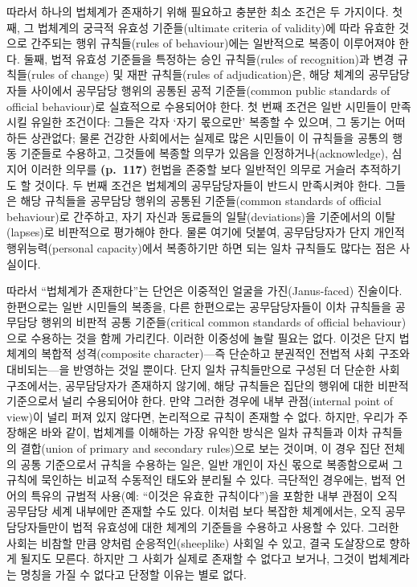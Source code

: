 따라서 하나의 법체계가 존재하기 위해 필요하고 충분한 최소 조건은 두
가지이다. 첫째, 그 법체계의 궁극적 유효성 기준들(ultimate criteria of
validity)에 따라 유효한 것으로 간주되는 행위 규칙들(rules of
behaviour)에는 일반적으로 복종이 이루어져야 한다. 둘째, 법적 유효성
기준들을 특정하는 승인 규칙들(rules of recognition)과 변경 규칙들(rules
of change) 및 재판 규칙들(rules of adjudication)은, 해당 체계의
공무담당자들 사이에서 공무담당 행위의 공통된 공적 기준들(common public
standards of official behaviour)로 실효적으로 수용되어야 한다. 첫 번째
조건은 일반 시민들이 만족시킬  유일한 조건이다:
그들은 각자 ‘자기 몫으로만’ 복종할 수 있으며, 그 동기는 어떠하든
상관없다; 물론 건강한 사회에서는 실제로 많은 시민들이 이 규칙들을 공통의
행동 기준들로 수용하고, 그것들에 복종할 의무가 있음을
인정하거나(acknowledge), 심지어 이러한 의무를 \textbf{(p.~117)} 헌법을
존중할 보다 일반적인 의무로 거슬러 추적하기도 할 것이다. 두 번째 조건은
법체계의 공무담당자들이 반드시 만족시켜야 한다. 그들은 해당 규칙들을
공무담당 행위의 공통된 기준들(common standards of official behaviour)로
간주하고, 자기 자신과 동료들의 일탈(deviations)을 기준에서의
이탈(lapses)로 비판적으로 평가해야 한다. 물론 여기에 덧붙여,
공무담당자가 단지 개인적 행위능력(personal capacity)에서 복종하기만 하면
되는 일차 규칙들도 많다는 점은 사실이다.

따라서 “법체계가 존재한다”는 단언은 이중적인 얼굴을 가진(Janus-faced)
진술이다. 한편으로는 일반 시민들의 복종을, 다른 한편으로는
공무담당자들이 이차 규칙들을 공무담당 행위의 비판적 공통 기준들(critical
common standards of official behaviour)으로 수용하는 것을 함께 가리킨다.
이러한 이중성에 놀랄 필요는 없다. 이것은 단지 법체계의 복합적
성격(composite character)---즉 단순하고 분권적인 전법적 사회 구조와
대비되는---을 반영하는 것일 뿐이다. 단지 일차 규칙들만으로 구성된 더
단순한 사회 구조에서는, 공무담당자가 존재하지 않기에, 해당 규칙들은
집단의 행위에 대한 비판적 기준으로서 널리 수용되어야 한다. 만약 그러한
경우에 내부 관점(internal point of view)이 널리 퍼져 있지 않다면,
논리적으로 규칙이 존재할 수 없다. 하지만, 우리가 주장해온 바와 같이,
법체계를 이해하는 가장 유익한 방식은 일차 규칙들과 이차 규칙들의
결합(union of primary and secondary rules)으로 보는 것이며, 이 경우 집단
전체의 공통 기준으로서 규칙을 수용하는 일은, 일반 개인이 자신 몫으로
복종함으로써 그 규칙에 묵인하는 비교적 수동적인 태도와 분리될 수 있다.
극단적인 경우에는, 법적 언어의 특유의 규범적 사용(예: “이것은 유효한
규칙이다”)을 포함한 내부 관점이 오직 공무담당 세계 내부에만 존재할 수도
있다. 이처럼 보다 복잡한 체계에서는, 오직 공무담당자들만이 법적 유효성에
대한 체계의 기준들을 수용하고 사용할 수 있다. 그러한 사회는 비참할 만큼
양처럼 순응적인(sheeplike) 사회일 수 있고, 결국 도살장으로 향하게 될지도
모른다. 하지만 그 사회가 실제로 존재할 수 없다고 보거나, 그것이
법체계라는 명칭을 가질 수 없다고 단정할 이유는 별로 없다.

